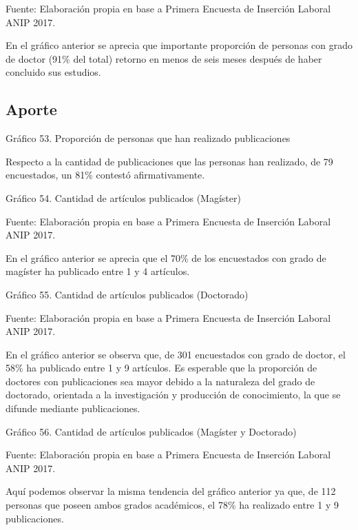 \documentclass{article}
\begin{document}
Fuente: Elaboración propia en base a Primera Encuesta de Inserción Laboral ANIP 2017.

En el gráfico anterior se aprecia que importante proporción de personas con grado de doctor (91\% del total) retorno en menos de seis meses después de haber concluido sus estudios.

\subsection{Aporte}

Gráfico 53. Proporción de personas que han realizado publicaciones


Respecto a la cantidad de publicaciones que las personas han realizado, de 79 encuestados, un 81\% contestó afirmativamente.

Gráfico 54. Cantidad de artículos publicados (Magíster)


Fuente: Elaboración propia en base a Primera Encuesta de Inserción Laboral ANIP 2017.

En el gráfico anterior se aprecia que el 70\% de los encuestados con grado de magíster ha publicado entre 1 y 4 artículos.

Gráfico 55. Cantidad de artículos publicados (Doctorado)


Fuente: Elaboración propia en base a Primera Encuesta de Inserción Laboral ANIP 2017.

En el gráfico anterior se observa que, de 301 encuestados con grado de doctor, el 58\% ha publicado entre 1 y 9 artículos. Es esperable que la proporción de doctores con publicaciones sea mayor debido a la naturaleza del grado de doctorado, orientada a la investigación y producción de conocimiento, la que se difunde mediante publicaciones.

Gráfico 56. Cantidad de artículos publicados (Magíster y Doctorado)


Fuente: Elaboración propia en base a Primera Encuesta de Inserción Laboral ANIP 2017.

Aquí podemos observar la misma tendencia del gráfico anterior ya que, de 112 personas que poseen ambos grados académicos, el 78\% ha realizado entre 1 y 9 publicaciones.
\end{document}
